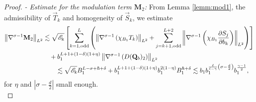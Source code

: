 \documentclass[11pt]{aims}
\theoremstyle{definition}
\numberwithin{equation}{section}
\begin{document}
\begin{proof}
\noindent \textit{- Estimate for the modulation term $\mathbf{M}_2$:} From Lemma \ref{lemm:mod1}, the admissibility of $\vec T_k$ and homogeneity of $\vec S_k$, we estimate 
\begin{align}
\left\|\nabla^{\sigma - 1}\mathbf{M}_2 \right\|_{L^2} &\lesssim \sqrt{{\mathscr{E}}_\Bbbk}\left[\sum_{k = 1, \textup{odd}}^{L}\left(\left\|\nabla^{\sigma  -1} \left(\chi_{B_1}T_k \right) \right\|_{L^2} + \sum_{j = k + 1, \textup{odd}}^{L+2} \left\|\nabla^{\sigma - 1}\left(\chi_{B_1} \frac{\partial S_j}{\partial b_k}\right) \right\|_{L^2}\right)\right]\nonumber\\
& \quad  + b_1^{L + 1 + (1 - \delta)(1 + \eta)}\left\|\nabla^{\sigma - 1}\left(D (\mathbf{Q}_b)_2\right)\right\|_{L^2}\nonumber\\
& \qquad \lesssim \sqrt{{\mathscr{E}}_\Bbbk}B_1^{L - \sigma + \hbar + \delta} + b_1^{L + 1 + (1 - \delta)(1 + \eta)}b_1^{2(1 - \eta)}B_1^{\hbar + \delta} \lesssim b_1 b_1^{\frac{\ell}{\ell - \gamma}\left(\sigma - \frac{d}{2}\right)} b_1^{\frac{\gamma - 1}{2}}, \label{est:modEs}
\end{align}
for $\eta$ and $\left|\sigma - \frac{d}{2}\right|$ small enough.\\


\end{proof}
\end{document}
